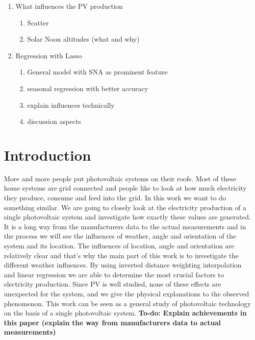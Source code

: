 \documentclass{article}
\begin{document}
\begin{enumerate}
	\item What influences the PV production\begin{enumerate}
		\item Scatter
		\item Solar Noon altitudes (what and why)
	\end{enumerate}
	\item Regression with Lasso\begin{enumerate}
		\item General model with SNA as prominent feature
		\item seasonal regression with better accuracy
		\item explain influences technically
		\item discussion aspects
	\end{enumerate}
\end{enumerate}


\section{Introduction}\label{sec:intro}
More and more people put photovoltaic systems on their roofs. 
Most of these home systems are grid connected and people like to look at how much electricity they produce, consume and feed into the grid.
In this work we want to do something similar. We are going to closely look at the electricity production of a single photovoltaic system and investigate how exactly these values are generated.
It is a long way from the manufacturers data to the actual measurements and in the process we will see the influences of weather, angle and orientation of the system and its location.
The influences of location, angle and orientation are relatively clear and that's why the main part of this work is to investigate the different weather influences.
By using inverted distance weighting interpolation and linear regression we are able to determine the most crucial factors to electricity production.
Since PV is well studied, none of these effects are unexpected for the system, and we give the physical explanations to the observed phenomenon.
This work can be seen as a general study of photovoltaic technology on the basis of a single photovoltaic system. 
\textbf{To-do: Explain achievements in this paper (explain the way from manufacturers data to actual measurements)}
\end{document}
